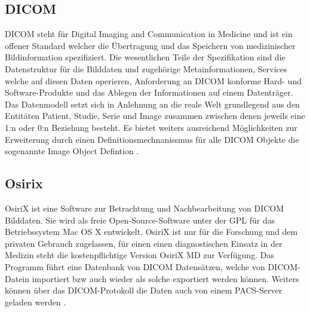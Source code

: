 \subsection{DICOM}
\label{sec:DICOM}
DICOM steht für Digital Imaging and Communication in Medicine und ist ein offener Standard welcher die Übertragung und das Speichern von medizinischer Bildinformation spezifiziert.
Die wesentlichen Teile der Spezifikation sind die Datenstruktur für die Bilddaten und zugehörige Metainformationen, 
Services welche auf diesen Daten operieren, Anforderung an DICOM konforme Hard- und Software-Produkte und das Ablegen der Informationen auf einem Datenträger.
Das Datenmodell setzt sich in Anlehnung an die reale Welt grundlegend aus den Entitäten Patient, Studie, Serie und Image zusammen zwischen denen jeweils eine 1:n oder 0:n Beziehung besteht.
Es bietet weiters ausreichend Möglichkeiten zur Erweiterung durch einen Definitionsmechnanissmus für alle DICOM Objekte die sogenannte Image Object Defintion \cite{pacs}.

\subsection{Osirix}
\label{sec:Osirix}
OsiriX ist eine Software zur Betrachtung und Nachbearbeitung von DICOM Bilddaten.
Sie wird als freie Open-Source-Software unter der GPL für das Betriebssystem Mac OS X entwickelt.
OsiriX ist nur für die Forschung und dem privaten Gebrauch zugelassen, 
für einen einen diagnostischen Einsatz in der Medizin steht die kostenpflichtige Version OsiriX MD zur Verfügung.
%
Das Programm führt eine Datenbank von DICOM Datensätzen, 
welche von DICOM-Datein importiert bzw auch wieder als solche exportiert werden können.
Weiters können über das DICOM-Protokoll die Daten auch von einem PACS-Server geladen werden \cite{osirix}.

